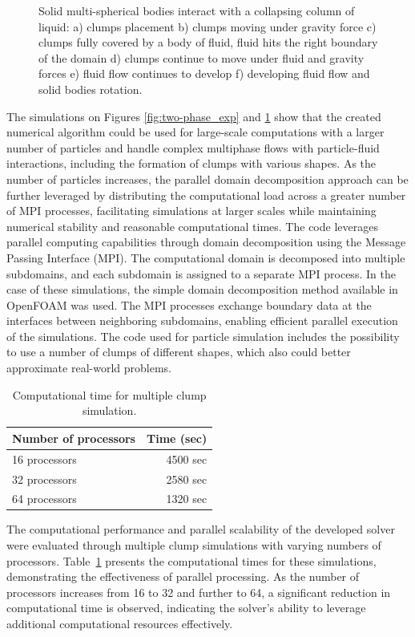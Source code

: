 \begin{figure}[H]
\begin{minipage}{.4\textwidth}
    \end{minipage}
    \caption{Solid multi-spherical bodies interact with a collapsing column of liquid: a) clumps placement b) clumps moving under gravity force c) clumps fully covered by a body of fluid, fluid hits the right boundary of the domain d) clumps continue to move under fluid and gravity forces e) fluid flow continues to develop f) developing fluid flow and solid bodies rotation.}
    \label{fig:two-phase_exp_clumps}
\end{figure}

The simulations on Figures \ref{fig:two-phase_exp} and \ref{fig:two-phase_exp_clumps} show that the created numerical algorithm could be used for large-scale computations with a larger number of particles and handle complex multiphase flows with particle-fluid interactions, including the formation of clumps with various shapes. As the number of particles increases, the parallel domain decomposition approach can be further leveraged by distributing the computational load across a greater number of MPI processes, facilitating simulations at larger scales while maintaining numerical stability and reasonable computational times. The code leverages parallel computing capabilities through domain decomposition using the Message Passing Interface (MPI). The computational domain is decomposed into multiple subdomains, and each subdomain is assigned to a separate MPI process. In the case of these simulations, the simple domain decomposition method available in OpenFOAM was used. The MPI processes exchange boundary data at the interfaces between neighboring subdomains, enabling efficient parallel execution of the simulations. The code used for particle simulation \cite{LIGGGHTS} includes the possibility to use a number of clumps of different shapes, which also could better approximate real-world problems.

\begin{table}[H]
    \centering
    \caption{Computational time for multiple clump simulation.} \label{table4-chap4}
    \begin{tabular}{lr}
        \toprule
        \hline
       Number of processors     & Time (sec)\\
        \hline
        \midrule
        16 processors &  4500 sec \\
        32 processors &   2580 sec\\
        64 processors &   1320 sec\\
                                \hline
        \bottomrule
     \end{tabular}
\end{table}
The computational performance and parallel scalability of the developed solver were evaluated through multiple clump simulations with varying numbers of processors. Table~\ref{table4-chap4} presents the computational times for these simulations, demonstrating the effectiveness of parallel processing. As the number of processors increases from 16 to 32 and further to 64, a significant reduction in computational time is observed, indicating the solver's ability to leverage additional computational resources effectively.

